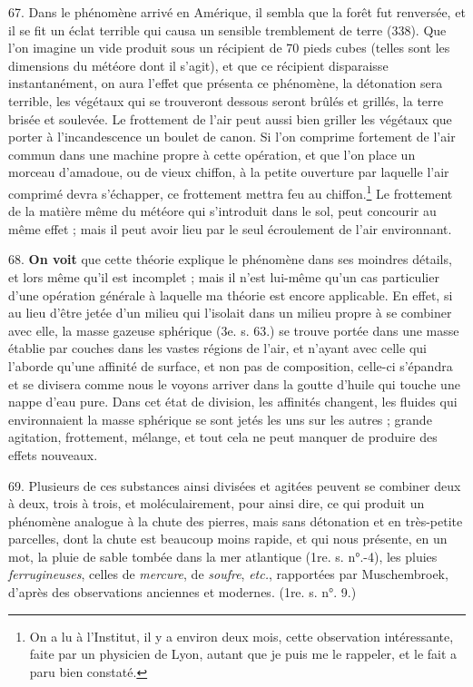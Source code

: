 \documentclass[a4paper, 11pt, oneside, polutonikogreek, french]{article}
\begin{document}
67. Dans le phénomène arrivé en Amérique, il sembla que la forêt fut renversée, et il se fit un éclat terrible qui causa un sensible tremblement de terre (338). Que l'on imagine un vide produit sous un récipient de 70 pieds cubes (telles sont les dimensions du météore dont il s'agit), et que ce récipient disparaisse instantanément, on aura l'effet que présenta ce phénomène, la détonation sera terrible, les végétaux qui se trouveront dessous seront brûlés et grillés, la terre brisée et soulevée. Le frottement de l'air peut aussi bien griller les végétaux que porter à l'incandescence un boulet de canon. Si l'on comprime fortement de l'air commun dans une machine propre à cette opération, et que l'on place un morceau d'amadoue, ou de vieux chiffon, à la petite ouverture par laquelle l'air comprimé devra s'échapper, ce frottement mettra feu au chiffon.\footnote{On a lu à l'Institut, il y a environ deux mois, cette observation intéressante, faite par un physicien de Lyon, autant que je puis me le rappeler, et le fait a paru bien constaté.} Le frottement de la matière même du météore qui s'introduit dans le sol, peut concourir au même effet ; mais il peut avoir lieu par le seul écroulement de l'air environnant.

68. \textbf{On voit} que cette théorie explique le phénomène dans ses moindres détails, et lors même qu'il est incomplet ; mais il n'est lui-même qu'un cas particulier d'une opération générale à laquelle ma théorie est encore applicable. En effet, si au lieu d'être jetée d'un milieu qui l'isolait dans un milieu propre à se combiner avec elle, la masse gazeuse sphérique (3e. s. 63.) se trouve portée dans une masse établie par couches dans les vastes régions de l'air, et n'ayant avec celle qui l'aborde qu'une affinité de surface, et non pas de composition, celle-ci s'épandra et se divisera comme nous le voyons arriver dans la goutte d'huile qui touche une nappe d'eau pure. Dans cet état de division, les affinités changent, les fluides qui environnaient la masse sphérique se sont jetés les uns sur les autres ; grande agitation, frottement, mélange, et tout cela ne peut manquer de produire des effets nouveaux.

69. Plusieurs de ces substances ainsi divisées et agitées peuvent se combiner deux à deux, trois à trois, et moléculairement, pour ainsi dire, ce qui produit un phénomène analogue à la chute des pierres, mais sans détonation et en très-petite parcelles, dont la chute est beaucoup moins rapide, et qui nous présente, en un mot, la pluie de sable tombée dans la mer atlantique (1re. s. n°.-4), les pluies \emph{ferrugineuses}, celles de \emph{mercure}, de \emph{soufre}, \emph{etc.}, rapportées par Muschembroek, d'après des observations anciennes et modernes. (1re. s. n°. 9.)
\end{document}

